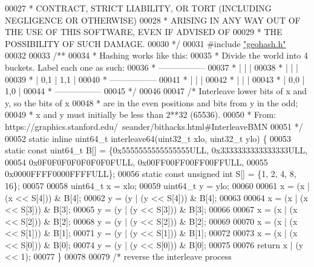 \begin{DoxyCode}
00027 \textcolor{comment}{ * CONTRACT, STRICT LIABILITY, OR TORT (INCLUDING NEGLIGENCE OR OTHERWISE)}
00028 \textcolor{comment}{ * ARISING IN ANY WAY OUT OF THE USE OF THIS SOFTWARE, EVEN IF ADVISED OF}
00029 \textcolor{comment}{ * THE POSSIBILITY OF SUCH DAMAGE.}
00030 \textcolor{comment}{ */}
00031 \textcolor{preprocessor}{#}\textcolor{preprocessor}{include} \hyperlink{geohash_8h}{"geohash.h"}
00032 
00033 \textcolor{comment}{/**}
00034 \textcolor{comment}{ * Hashing works like this:}
00035 \textcolor{comment}{ * Divide the world into 4 buckets.  Label each one as such:}
00036 \textcolor{comment}{ *  -----------------}
00037 \textcolor{comment}{ *  |       |       |}
00038 \textcolor{comment}{ *  |       |       |}
00039 \textcolor{comment}{ *  | 0,1   | 1,1   |}
00040 \textcolor{comment}{ *  -----------------}
00041 \textcolor{comment}{ *  |       |       |}
00042 \textcolor{comment}{ *  |       |       |}
00043 \textcolor{comment}{ *  | 0,0   | 1,0   |}
00044 \textcolor{comment}{ *  -----------------}
00045 \textcolor{comment}{ */}
00046 
00047 \textcolor{comment}{/* Interleave lower bits of x and y, so the bits of x}
00048 \textcolor{comment}{ * are in the even positions and bits from y in the odd;}
00049 \textcolor{comment}{ * x and y must initially be less than 2**32 (65536).}
00050 \textcolor{comment}{ * From:  https://graphics.stanford.edu/~seander/bithacks.html#InterleaveBMN}
00051 \textcolor{comment}{ */}
00052 \textcolor{keyword}{static} \textcolor{keyword}{inline} uint64\_t interleave64(uint32\_t xlo, uint32\_t ylo) \{
00053     \textcolor{keyword}{static} \textcolor{keyword}{const} uint64\_t B[] = \{0x5555555555555555ULL, 0x3333333333333333ULL,
00054                                  0x0F0F0F0F0F0F0F0FULL, 0x00FF00FF00FF00FFULL,
00055                                  0x0000FFFF0000FFFFULL\};
00056     \textcolor{keyword}{static} \textcolor{keyword}{const} \textcolor{keywordtype}{unsigned} \textcolor{keywordtype}{int} S[] = \{1, 2, 4, 8, 16\};
00057 
00058     uint64\_t x = xlo;
00059     uint64\_t y = ylo;
00060 
00061     x = (x | (x << S[4])) & B[4];
00062     y = (y | (y << S[4])) & B[4];
00063 
00064     x = (x | (x << S[3])) & B[3];
00065     y = (y | (y << S[3])) & B[3];
00066 
00067     x = (x | (x << S[2])) & B[2];
00068     y = (y | (y << S[2])) & B[2];
00069 
00070     x = (x | (x << S[1])) & B[1];
00071     y = (y | (y << S[1])) & B[1];
00072 
00073     x = (x | (x << S[0])) & B[0];
00074     y = (y | (y << S[0])) & B[0];
00075 
00076     \textcolor{keywordflow}{return} x | (y << 1);
00077 \}
00078 
00079 \textcolor{comment}{/* reverse the interleave process}

\end{DoxyCode}
